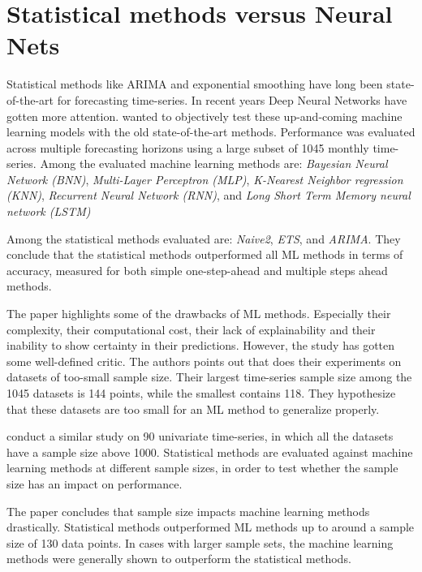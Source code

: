 \section{Statistical methods versus Neural Nets}
\label{section:RelatedWork:Statistical-NN}

Statistical methods like ARIMA and exponential smoothing have long been state-of-the-art for forecasting time-series.
In recent years Deep Neural Networks have gotten more attention.
\cite{Makridakis2018} wanted to objectively test these up-and-coming machine learning models with the old state-of-the-art methods.
Performance was evaluated across multiple forecasting horizons using a large subset of 1045 monthly time-series.
Among the evaluated machine learning methods are:
\textit{Bayesian Neural Network (BNN)},
\textit{Multi-Layer Perceptron (MLP)},
\textit{K-Nearest Neighbor regression (KNN)},
\textit{Recurrent Neural Network (RNN)}, and
\textit{Long Short Term Memory neural network (LSTM)}


Among the statistical methods evaluated are:
\textit{Naive2},
\textit{ETS}, and
\textit{ARIMA}.
They conclude that the statistical methods outperformed all ML methods in terms of accuracy, measured for both
simple one-step-ahead and multiple steps ahead methods.

The paper \cite{Makridakis2018} highlights some of the drawbacks of ML methods. Especially their complexity, their computational cost,
their lack of explainability and their inability to show certainty in their predictions.
However, the study has gotten some well-defined critic. The authors \citeauthor*{Cerqueira2019} points
out that \cite{Makridakis2018} does their experiments on datasets of too-small sample size.
Their largest time-series sample size among the 1045 datasets is 144 points, while the smallest contains 118.
They hypothesize that these datasets are too small for an ML method to generalize properly.

\cite{Cerqueira2019} conduct a similar study on 90 univariate time-series, in which
all the datasets have a sample size above 1000.
Statistical methods are evaluated against machine learning methods at different sample sizes,
in order to test whether the sample size has an impact on performance.

The paper \cite{Cerqueira2019} concludes that sample size impacts machine learning methods drastically.
Statistical methods outperformed ML methods up to around a sample size of 130 data points.
In cases with larger sample sets, the machine learning methods were generally shown to outperform the statistical methods.

